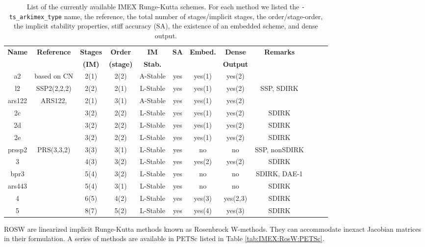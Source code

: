 \begin{table}
\centering
\caption{\label{tab:IMEX:RK:PETSc} List of the  currently available
IMEX Runge-Kutta schemes.  For each method we listed the \texttt{-ts\_arkimex\_type}
  name, the reference, the
  total number
  of stages/implicit stages, the order/stage-order,
  the implicit stability properties, stiff accuracy (SA), the
  existence of an embedded scheme, and dense output.}
\begin{tabular}{|c|c|c|c|c|c|c|c|c|c|c|c|}
\hline
{\bf Name}&{\bf Reference} &{\bf Stages} &{\bf Order}&{\bf IM}     &{\bf SA}&{\bf Embed.}&{\bf Dense}& {\bf Remarks}\\
 &  &{\bf (IM)}   &{\bf (stage)}& {\bf Stab.}&&      &{\bf Output}&\\
\hline
a2&based on CN&2(1)&2(2)&A-Stable&yes&yes(1)&yes(2)&\\
\hline
l2&SSP2(2,2,2)\cite{Pareschi_2005}
&2(2)&2(1)&L-Stable&yes&yes(1)&yes(2)&SSP, SDIRK\\
\hline
ars122&ARS122,
\cite{Ascher_1997}&2(1)&3(1)&A-Stable&yes&yes(1)&yes(2)&\\
\hline
2c&\cite{Giraldo_2013}&3(2)&2(2)&L-Stable&yes&yes(1)&yes(2)&SDIRK\\
\hline
2d&\cite{Giraldo_2013}&3(2)&2(2)&L-Stable&yes&yes(1)&yes(2)&SDIRK\\
\hline
2e&\cite{Giraldo_2013}&3(2)&2(2)&L-Stable&yes&yes(1)&yes(2)&SDIRK\\
\hline
prssp2&PRS(3,3,2)
\cite{Pareschi_2005}&3(3)&3(1)&L-Stable&yes&no&no&SSP, nonSDIRK\\
\hline
3&\cite{Kennedy_2003}&4(3)&3(2)&L-Stable&yes&yes(2)&yes(2)&SDIRK\\
\hline
bpr3&\cite{Boscarino_TR2011}&5(4)&3(2)&L-Stable&yes&no&no&SDIRK, DAE-1\\
\hline
ars443&\cite{Ascher_1997}&5(4)&3(1)&L-Stable&yes&no&no&SDIRK\\
\hline
4&\cite{Kennedy_2003}&6(5)&4(2)&L-Stable&yes&yes(3)&yes(2,3)&SDIRK\\
\hline
5&\cite{Kennedy_2003}&8(7)&5(2)&L-Stable&yes&yes(4)&yes(3)&SDIRK\\
\hline
\end{tabular}
\end{table}
%

ROSW are linearized implicit Runge-Kutta methods known as Rosenbrock
W-methods. They can accommodate inexact Jacobian matrices in their
formulation. A series of methods are available in PETSc listed in
Table \ref{tab:IMEX:RosW:PETSc}.

